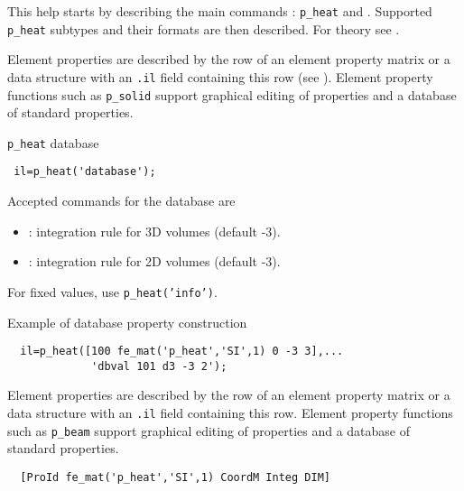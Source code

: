 This help starts by describing the main commands : {\tt p\_heat}  and . Supported {\tt p\_heat} subtypes and their formats are then described. For theory see .

\ruic{p\_heat}{Database}{,Dbval]  ...} %

Element properties are described by the row of an element property matrix or a data structure with an {\tt .il} field containing this row (see ). Element property functions such as {\tt p\_solid} support graphical editing of properties and a database of standard properties. 

{\tt p\_heat} database

\begin{verbatim}
 il=p_heat('database');
\end{verbatim}%

Accepted commands for the database are 
%
\begin{itemize}
\item {} :  integration rule for 3D volumes (default -3). 
\item {} :  integration rule for 2D volumes (default -3).
\end{itemize}

For fixed values, use {\tt p\_heat('info')}.

Example of database property construction

\begin{verbatim}
  il=p_heat([100 fe_mat('p_heat','SI',1) 0 -3 3],...
             'dbval 101 d3 -3 2');
\end{verbatim}%



Element properties are described by the row of an element property matrix or a data structure with an {\tt .il} field containing this row. Element property functions such as {\tt p\_beam} support graphical editing of properties and a database of standard properties. 




\begin{verbatim}
  [ProId fe_mat('p_heat','SI',1) CoordM Integ DIM]
\end{verbatim}


